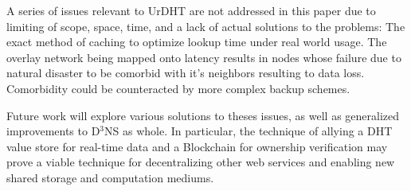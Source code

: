 \documentclass[11pt]{IEEEtran} %
\begin{document}
A series of issues relevant to UrDHT are not addressed in this paper due to limiting of scope, space, time, and a lack of actual solutions to the problems: The exact method of caching to optimize lookup time under real world usage. The overlay network being mapped onto latency results in nodes whose failure due to natural disaster to be comorbid with it's neighbors resulting to data loss. Comorbidity could be counteracted by more complex backup schemes.

Future work will explore various solutions to theses issues, as well as generalized improvements to D$^3$NS as whole.  In particular, the technique of allying a DHT value store for real-time data and a Blockchain for ownership verification may prove a viable technique for decentralizing other web services and enabling new shared storage and computation mediums.




\end{document}
